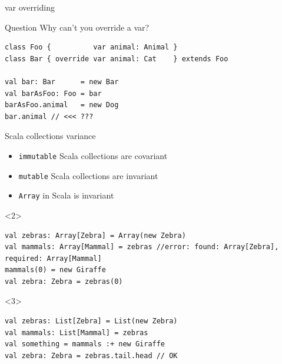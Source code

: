 \documentclass[aspectratio=169]{beamer}
\begin{document}
\begin{frame}[fragile]{var overriding}
\begin{block}{Question}
  Why can't you override a var?
\end{block}
\pause
\begin{verbatim}
class Foo {          var animal: Animal }
class Bar { override var animal: Cat    } extends Foo

val bar: Bar      = new Bar
val barAsFoo: Foo = bar
barAsFoo.animal   = new Dog
bar.animal // <<< ???
\end{verbatim}
\end{frame}

\begin{frame}[fragile]{Scala collections variance}
\begin{itemize}
  \item \texttt{immutable} Scala collections are \alert{covariant}
  \item \texttt{mutable} Scala collections are \alert{invariant}
  \item \texttt{Array} in Scala is \alert{invariant}
\end{itemize}
\begin{onlyenv}<2>
  \vspace{2em}
\begin{verbatim}
val zebras: Array[Zebra] = Array(new Zebra)
val mammals: Array[Mammal] = zebras //error: found: Array[Zebra], required: Array[Mammal]
mammals(0) = new Giraffe
val zebra: Zebra = zebras(0)
\end{verbatim}
\end{onlyenv}
\begin{onlyenv}<3>
  \vspace{2em}
\begin{verbatim}
val zebras: List[Zebra] = List(new Zebra)
val mammals: List[Mammal] = zebras
val something = mammals :+ new Giraffe
val zebra: Zebra = zebras.tail.head // OK
\end{verbatim}
\end{onlyenv}
\end{frame}
\end{document}
